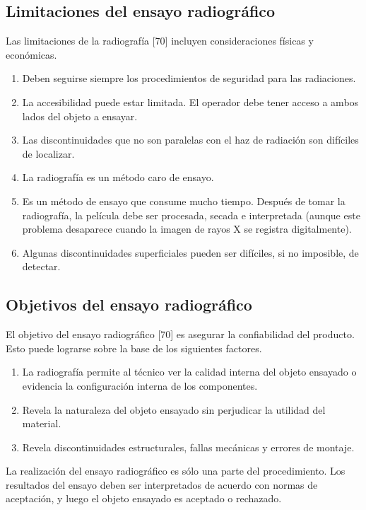 \subsection{Limitaciones del ensayo radiográfico}
Las limitaciones de la radiografía [70] incluyen consideraciones físicas y económicas.

\begin{enumerate}
\item Deben seguirse siempre los procedimientos de seguridad para las radiaciones.
\item La accesibilidad puede estar limitada. El operador debe tener acceso a ambos lados del objeto a ensayar.
\item Las discontinuidades que no son paralelas con el haz de radiación son difíciles de localizar.
\item La radiografía es un método caro de ensayo.
\item Es un método de ensayo que consume mucho tiempo. Después de tomar la radiografía, la película debe ser procesada, secada e interpretada (aunque este problema desaparece cuando la imagen de rayos X se registra digitalmente).
\item Algunas discontinuidades superficiales pueden ser difíciles, si no imposible, de detectar.
\end{enumerate}

\subsection{Objetivos del ensayo radiográfico}
El objetivo del ensayo radiográfico [70] es asegurar la confiabilidad del producto. Esto puede lograrse sobre la base de los siguientes factores.

\begin{enumerate}
\item La radiografía permite al técnico ver la calidad interna del objeto ensayado o evidencia la
configuración interna de los componentes.
\item Revela la naturaleza del objeto ensayado sin perjudicar la utilidad del material.
\item Revela discontinuidades estructurales, fallas mecánicas y errores de montaje.
\end{enumerate}

La realización del ensayo radiográfico es sólo una parte del procedimiento. Los resultados del ensayo deben ser interpretados de acuerdo con normas de aceptación, y luego el objeto ensayado es aceptado o rechazado.

